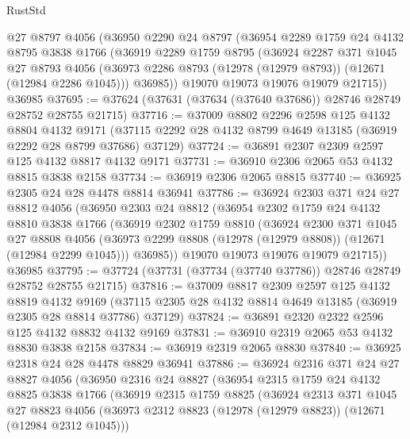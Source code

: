 \begin{lexlean}{RustStd}
\begin{coremodule}
    @27
    @8797
    @4056
    (@36950
      @2290
      @24
      @8797
      (@36954
        @2289
        @1759
        @24
        @4132
        @8795
        @3838
        @1766
        (@36919
          @2289
          @1759
          @8795
          (@36924
            @2287
            @371
            @1045
            @27
            @8793
            @4056
            (@36973 @2286 @8793 (@12978 (@12979 @8793)) (@12671 (@12984 @2286 @1045)))
            @36985))
        @19070
        @19073
        @19076
        @19079
        @21715))
    @36985
@37695 := @37624 (@37631 (@37634 (@37640 @37686)) @28746 @28749 @28752 @28755 @21715)
@37716 := @37009
    @8802
    @2296
    @2598
    @125
    @4132
    @8804
    @4132
    @9171
    (@37115 @2292 @28 @4132 @8799 @4649 @13185 (@36919 @2292 @28 @8799 @37686) @37129)
@37724 := @36891 @2307 @2309 @2597 @125 @4132 @8817 @4132 @9171
@37731 := @36910 @2306 @2065 @53 @4132 @8815 @3838 @2158
@37734 := @36919 @2306 @2065 @8815
@37740 := @36925 @2305 @24 @28 @4478 @8814 @36941
@37786 := @36924
    @2303
    @371
    @24
    @27
    @8812
    @4056
    (@36950
      @2303
      @24
      @8812
      (@36954
        @2302
        @1759
        @24
        @4132
        @8810
        @3838
        @1766
        (@36919
          @2302
          @1759
          @8810
          (@36924
            @2300
            @371
            @1045
            @27
            @8808
            @4056
            (@36973 @2299 @8808 (@12978 (@12979 @8808)) (@12671 (@12984 @2299 @1045)))
            @36985))
        @19070
        @19073
        @19076
        @19079
        @21715))
    @36985
@37795 := @37724 (@37731 (@37734 (@37740 @37786)) @28746 @28749 @28752 @28755 @21715)
@37816 := @37009
    @8817
    @2309
    @2597
    @125
    @4132
    @8819
    @4132
    @9169
    (@37115 @2305 @28 @4132 @8814 @4649 @13185 (@36919 @2305 @28 @8814 @37786) @37129)
@37824 := @36891 @2320 @2322 @2596 @125 @4132 @8832 @4132 @9169
@37831 := @36910 @2319 @2065 @53 @4132 @8830 @3838 @2158
@37834 := @36919 @2319 @2065 @8830
@37840 := @36925 @2318 @24 @28 @4478 @8829 @36941
@37886 := @36924
    @2316
    @371
    @24
    @27
    @8827
    @4056
    (@36950
      @2316
      @24
      @8827
      (@36954
        @2315
        @1759
        @24
        @4132
        @8825
        @3838
        @1766
        (@36919
          @2315
          @1759
          @8825
          (@36924
            @2313
            @371
            @1045
            @27
            @8823
            @4056
            (@36973 @2312 @8823 (@12978 (@12979 @8823)) (@12671 (@12984 @2312 @1045)))

\end{coremodule}
\end{lexlean}
